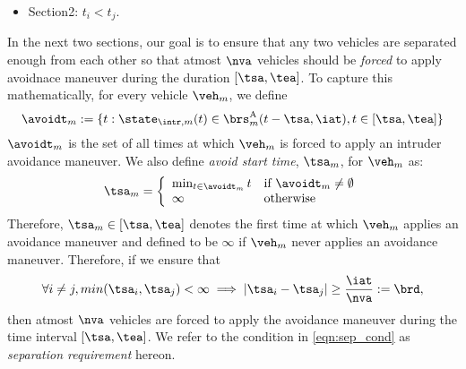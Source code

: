 {\begin{itemize}
\begin{itemize}
\item Section12: Next we want to make sure that $\veh_i$ is far away from this set such that the intruder will need atleast a duration of $\brd$ to reach any state such that $\state_{\intr,i}$ is on the boundary of the avoid set of $\veh_i$. In relative co-ordinates, if we compute min-min set and augment it on set in Section 11, and ensure that the boundary of the avoid region is outside this augmented set then we are done. Draw a table listing the duration of each set. Mention the duration relationships. Draw a diagram showing different sets. 
\item Section13: Obstacle computation. First compute the directly induced obstacle by $\veh_j$ at time $t$ for all possible $\tsa$. Then compute the obstacle that $\veh_i$ need to avoid at any future time for different $\tsa$. Therefore, compute the BRS that it needs to avoid at $\tsa$.    
\end{itemize}
\item Section2: $t_i < t_j$.
\end{itemize}
}

In the next two sections, our goal is to ensure that any two vehicles are separated enough from each other so that %
atmost $\nva$ vehicles should be \textit{forced} to apply avoidnace maneuver during the duration $[\tsa, \tea]$. To capture this mathematically, for every vehicle $\veh_m$, we define 
\begin{equation*}
\avoidt_{m} := \{t: \state_{\intr,m}(t) \in \brs^{\text{A}}_{m}(t-\tsa, \iat), t \in [\tsa, \tea]\}
\end{equation*} 
$\avoidt_{m}$ is the set of all times at which $\veh_m$ is forced to apply an intruder avoidance maneuver. We also define \textit{avoid start time}, $\tsa_m$, for $\veh_m$ as:
\begin{equation}
\tsa_m  = 
\left \{ 
\begin{array}{ll}
\min_{t \in  \avoidt_{m}} t & \mbox{if~} \avoidt_{m} \neq \emptyset\\
\infty & \mbox{otherwise}
\end{array}
\right.
\end{equation}  
Therefore, $\tsa_m \in [\tsa, \tea]$ denotes the first time at which $\veh_m$ applies an avoidance maneuver and defined to be $\infty$ if $\veh_m$ never applies an avoidance maneuver. %
Therefore, if we ensure that 
\begin{equation} \label{eqn:sep_cond}
\forall i \neq j, min(\tsa_i, \tsa_j)< \infty \implies |\tsa_i - \tsa_j| \geq \frac{\iat}{\nva} := \brd,
\end{equation}
then atmost $\nva$ vehicles are forced to apply the avoidance maneuver during the time interval $[\tsa, \tea]$. We refer to the condition in \eqref{eqn:sep_cond} as \textit{separation requirement} hereon. 

